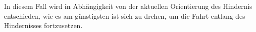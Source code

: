  In diesem Fall wird in Abhängigkeit von der aktuellen Orientierung des Hindernis entschieden, wie es am günstigsten ist sich zu drehen, um die Fahrt entlang des Hindernisses fortzusetzen.







 




%



